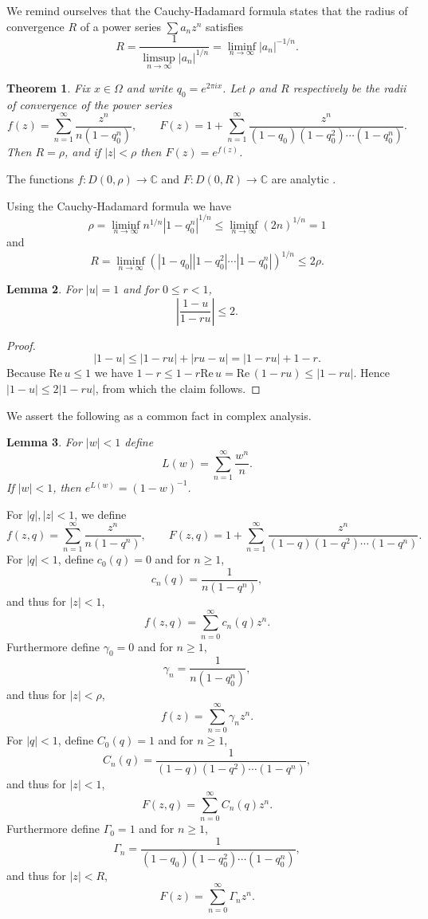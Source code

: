 \documentclass{article}
\def\Re{\ensuremath{\mathrm{Re}}\,}
\newtheorem{theorem}{Theorem}
\newtheorem{lemma}[theorem]{Lemma}
\begin{document}
We remind ourselves that the Cauchy-Hadamard formula states that the radius of
convergence $R$ of a  power series $\sum a_n z^n$ satisfies
\[
R =\frac{1}{\limsup_{n \to \infty} |a_n|^{1/n}} =  \liminf_{n \to \infty} |a_n|^{-1/n}.
\]


\begin{theorem}
Fix $x \in \Omega$ and write $q_0=e^{2\pi ix}$. Let $\rho$ and $R$ respectively be   the radii of convergence of the power series
\[
f(z) = \sum_{n=1}^\infty \frac{z^n}{n(1-q_0^n)},\qquad F(z) = 1 + \sum_{n=1}^\infty \frac{z^n}{(1-q_0) (1-q_0^2)\cdots (1-q_0^n)}.
\]
Then $R=\rho$, and if $|z|<\rho$ then $F(z) = e^{f(z)}$. 
\label{efz}
\end{theorem}

The functions $f:D(0,\rho) \to \mathbb{C}$ and $F:D(0,R) \to \mathbb{C}$ are analytic \cite[p.~69, Theorem 2.16]{titchmarsh}.


Using the Cauchy-Hadamard formula we have
\[
\rho = \liminf_{n \to \infty} n^{1/n} |1-q_0^n|^{1/n}
\leq \liminf_{n \to \infty} (2n)^{1/n} = 1
\]
and
\begin{equation}
R = \liminf_{n \to \infty} (|1-q_0| |1-q_0^2| \cdots |1-q_0^n|)^{1/n}
\leq 2\rho.
\label{R2rho}
\end{equation}


\begin{lemma}
For $|u| = 1$ and for $0 \leq r < 1$,
\[
\left| \frac{1-u}{1-ru} \right| \leq 2.
\]
\label{unimodular}
\end{lemma}
\begin{proof}
\[
|1-u| \leq |1-ru| + |ru-u| = |1-ru| + 1-r.
\]
Because $\Re u \leq 1$ we have $1-r \leq 1-r \Re u = \Re(1-ru) \leq |1-ru|$. 
Hence $|1-u| \leq 2|1-ru|$, from which the claim follows.
\end{proof}


We assert the following as a common fact in complex analysis.

\begin{lemma}
For $|w|<1$ define
\[
L(w) = \sum_{n=1}^\infty \frac{w^n}{n}.
\]
If $|w|<1$, then $e^{L(w)} = (1-w)^{-1}$. 
\label{logarithmlemma}
\end{lemma}





For $|q|, |z|<1$, we define
\[
f(z,q) = \sum_{n=1}^\infty \frac{z^n}{n(1-q^n)},\qquad F(z,q) = 1 + \sum_{n=1}^\infty \frac{z^n}{(1-q)(1-q^2)\cdots (1-q^n)}.
\]
For $|q|<1$, define $c_0(q)=0$ and for $n \geq 1$,
\[
c_n(q)=\frac{1}{n(1-q^n)},
\]
and thus for $|z|<1$,
\[
f(z,q) = \sum_{n=0}^\infty c_n(q) z^n.
\]
Furthermore define $\gamma_0=0$ and for $n \geq 1$,
\[
\gamma_n = \frac{1}{n(1-q_0^n)},
\]
and thus for $|z|<\rho$,
\[
f(z) = \sum_{n=0}^\infty \gamma_n z^n.
\]
For $|q|<1$, define $C_0(q)=1$ and for $n \geq 1$,
\[
C_n(q) = \frac{1}{(1-q)(1-q^2) \cdots (1-q^n)},
\]
and thus for $|z|<1$,
\[
F(z,q) = \sum_{n=0}^\infty C_n(q) z^n.
\]
Furthermore define $\Gamma_0=1$ and for $n \geq 1$,
\[
\Gamma_n = \frac{1}{(1-q_0)  (1-q_0^2) \cdots (1-q_0^n)},
\]
and thus for $|z|<R$,
\[
F(z) = \sum_{n=0}^\infty \Gamma_n z^n. 
\]
\end{document}
